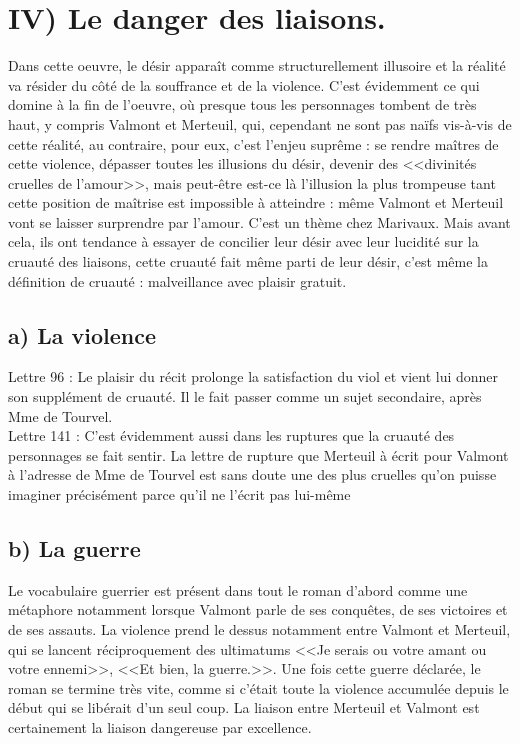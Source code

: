 \documentclass[12pt]{article}
\begin{document}
\section*{IV) Le danger des liaisons.}
Dans cette oeuvre, le désir apparaît comme structurellement illusoire et la réalité va résider du côté de la souffrance et de la violence. C'est évidemment ce qui domine à la fin de l'oeuvre, où presque tous les personnages tombent de très haut, y compris Valmont et Merteuil, qui, cependant ne sont pas naïfs vis-à-vis de cette réalité, au contraire, pour eux, c'est l'enjeu suprême : se rendre maîtres de cette violence, dépasser toutes les illusions du désir, devenir des <<divinités cruelles de l'amour>>, mais peut-être est-ce là l'illusion la plus trompeuse tant cette position de maîtrise est impossible à atteindre : même Valmont et Merteuil vont se laisser surprendre par l'amour. C'est un thème chez Marivaux.
Mais avant cela, ils ont tendance à essayer de concilier leur désir avec leur lucidité sur la cruauté des liaisons, cette cruauté fait même parti de leur désir, c'est même la définition de cruauté : malveillance avec plaisir gratuit.
\subsection*{a) La violence}
Lettre 96 : Le plaisir du récit prolonge la satisfaction du viol et vient lui donner son supplément de cruauté.
Il le fait passer comme un sujet secondaire, après Mme de Tourvel. \\
Lettre 141 : C'est évidemment aussi dans les ruptures que la cruauté des personnages se fait sentir. La lettre de rupture que Merteuil à écrit pour Valmont à l'adresse de Mme de Tourvel est sans doute une des plus cruelles qu'on puisse imaginer précisément parce qu'il ne l'écrit pas lui-même
\subsection*{b) La guerre}
Le vocabulaire guerrier est présent dans tout le roman d'abord comme une métaphore notamment lorsque Valmont parle de ses conquêtes, de ses victoires et de ses assauts.
La violence prend le dessus notamment entre Valmont et Merteuil, qui se lancent réciproquement des ultimatums <<Je serais ou votre amant ou votre ennemi>>, <<Et bien, la guerre.>>.
Une fois cette guerre déclarée, le roman se termine très vite, comme si c'était toute la violence accumulée depuis le début qui se libérait d'un seul coup.
La liaison entre Merteuil et Valmont est certainement la liaison dangereuse par excellence.
\end{document}
